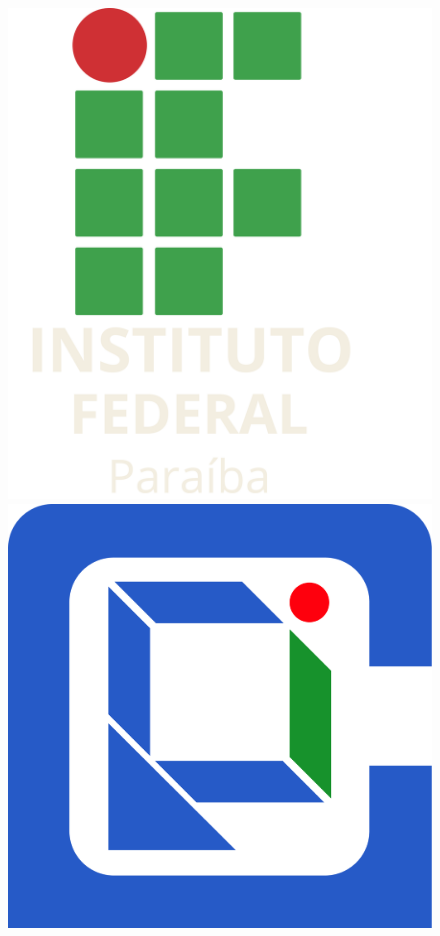 \documentclass[c]{beamer}
\begin{document}
\begin{darkframes}
\begin{frame}
    \begin{figure}[b]
      \includegraphics[width=.25\textwidth]{./fibeamer/logo/zut/ifpb.png}
      \hspace{1cm}
      \includegraphics[width=.25\textwidth]{./fibeamer/logo/zut/gcompi.png}
    \end{figure}
  \end{frame}


\end{darkframes}
\end{document}
